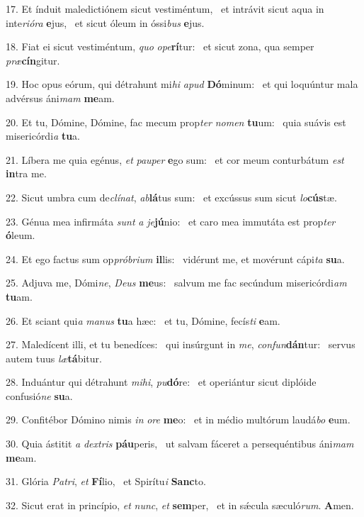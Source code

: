 17. Et índuit maledictiónem sicut vestiméntum, \dag\  et intrávit sicut aqua in inte\textit{ri}\textit{ó}\textit{ra} \textbf{e}jus, \ast\  et sicut óleum in óssi\textit{bus} \textbf{e}jus.\

18. Fiat ei sicut vestiméntum, \textit{quo} \textit{o}\textit{pe}\textbf{rí}tur: \ast\  et sicut zona, qua semper \textit{præ}\textbf{cín}gitur.\

19. Hoc opus eórum, qui détrahunt mi\textit{hi} \textit{a}\textit{pud} \textbf{Dó}minum: \ast\  et qui loquúntur mala advérsus áni\textit{mam} \textbf{me}am.\

20. Et tu, Dómine, Dómine, fac mecum prop\textit{ter} \textit{no}\textit{men} \textbf{tu}um: \ast\  quia suávis est misericórdi\textit{a} \textbf{tu}a.\

21. Líbera me quia egénus, \textit{et} \textit{pau}\textit{per} \textbf{e}go sum: \ast\  et cor meum conturbátum \textit{est} \textbf{in}tra me.\

22. Sicut umbra cum de\textit{clí}\textit{nat}, \textit{ab}\textbf{lá}tus sum: \ast\  et excússus sum sicut \textit{lo}\textbf{cús}tæ.\

23. Génua mea infirmáta \textit{sunt} \textit{a} \textit{je}\textbf{jú}nio: \ast\  et caro mea immutáta est prop\textit{ter} \textbf{ó}leum.\

24. Et ego factus sum op\textit{pró}\textit{bri}\textit{um} \textbf{il}lis: \ast\  vidérunt me, et movérunt cápi\textit{ta} \textbf{su}a.\

25. Adjuva me, Dómi\textit{ne}, \textit{De}\textit{us} \textbf{me}us: \ast\  salvum me fac secúndum misericórdi\textit{am} \textbf{tu}am.\

26. Et sciant qui\textit{a} \textit{ma}\textit{nus} \textbf{tu}a hæc: \ast\  et tu, Dómine, fecís\textit{ti} \textbf{e}am.\

27. Maledícent illi, et tu benedíces: \dag\  qui insúrgunt in \textit{me}, \textit{con}\textit{fun}\textbf{dán}tur: \ast\  servus autem tuus \textit{læ}\textbf{tá}bitur.\

28. Induántur qui détrahunt \textit{mi}\textit{hi}, \textit{pu}\textbf{dó}re: \ast\  et operiántur sicut diplóide confusió\textit{ne} \textbf{su}a.\

29. Confitébor Dómino nimis \textit{in} \textit{o}\textit{re} \textbf{me}o: \ast\  et in médio multórum laudá\textit{bo} \textbf{e}um.\

30. Quia ástitit \textit{a} \textit{dex}\textit{tris} \textbf{páu}peris, \ast\  ut salvam fáceret a persequéntibus áni\textit{mam} \textbf{me}am.\

31. Glória \textit{Pa}\textit{tri}, \textit{et} \textbf{Fí}lio, \ast\  et Spirítu\textit{i} \textbf{Sanc}to.\

32. Sicut erat in princípio, \textit{et} \textit{nunc}, \textit{et} \textbf{sem}per, \ast\  et in sǽcula sæculó\textit{rum}. \textbf{A}men.\

